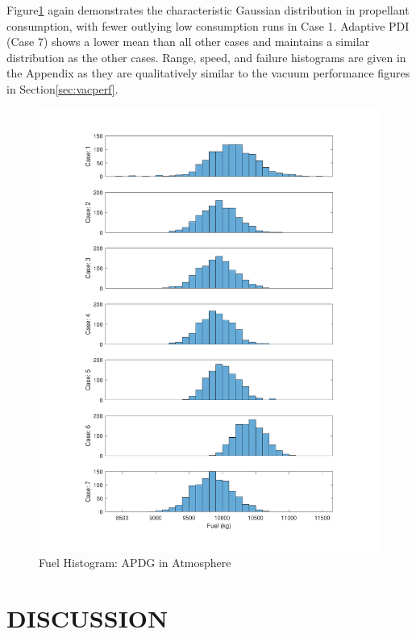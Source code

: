 Figure\:\ref{fig:hfueldisppowatmo} again demonstrates the characteristic Gaussian distribution in propellant consumption, with fewer outlying low consumption runs in Case 1. Adaptive PDI (Case 7) shows a lower mean than all other cases and maintains a similar distribution as the other cases. Range, speed, and failure histograms are given in the Appendix as they are qualitatively similar to the vacuum performance figures in Section\:\ref{sec:vacperf}.


\begin{figure}[H]
	\centering
	\begin{minipage}{4.3 in}
		\includegraphics[width=\linewidth]{Figures/hfueldisppowatmo.pdf}
		\caption{Fuel Histogram: APDG in Atmosphere \label{fig:hfueldisppowatmo} }
	\end{minipage}
\end{figure}

\chapter{DISCUSSION} \label{chap:discussion}

